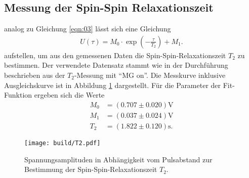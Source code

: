 \subsection{Messung der Spin-Spin Relaxationszeit}
\noindent analog zu Gleichung \ref{eqn:03} lässt sich eine Gleichung
\begin{align}
  U(\tau) = M_0 \cdot \exp{\left(- \frac{\tau}{T_2}\right)} + M_1.
  \label{eqn:04}
\end{align}
\noindent aufstellen, um aus den gemessenen Daten die
Spin-Spin-Relaxationszeit $T_2$ zu bestimmen. Der verwendete Datensatz stammt
wie in der Durchführung beschrieben aus der $T_2$-Messung mit \enquote{MG on}.
Die Messkurve inklusive Ausgleichskurve ist in Abbildung \ref{fig:02}
dargestellt. Für die Parameter der Fit-Funktion ergeben sich die Werte
\begin{align*}
  M_0 &=  (0.707  \pm  0.020) \si{\volt} \\
  M_1 &=  (0.037  \pm  0.024) \si{\volt} \\
  T_2 &=  (1.822  \pm  0.120) \si{\second}.
\end{align*}
\FloatBarrier
\begin{figure}
  \texttt{[image: build/T2.pdf]}
  \caption{Spannungsamplituden in Abhängigkeit vom Pulsabstand zur Bestimmung
           der Spin-Spin-Relaxationszeit $T_2$.}
  \label{fig:02}
\end{figure}
\FloatBarrier
